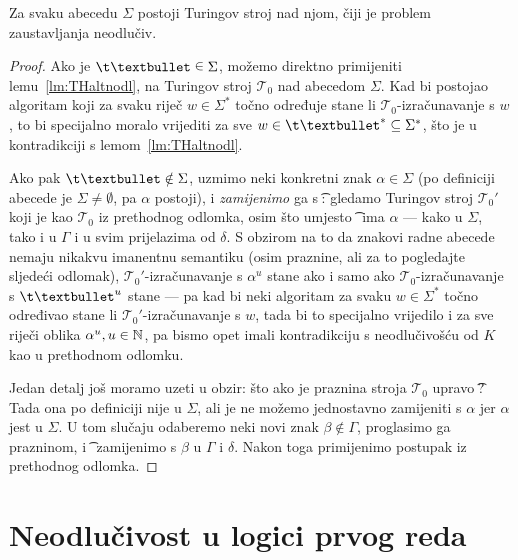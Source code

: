 \begin{propozicija}
Za svaku abecedu $\Sigma$ postoji Turingov stroj nad njom, čiji je problem zaustavljanja neodlučiv.
\end{propozicija}
\begin{proof}
Ako je $\t\textbullet\;\raisebox{1.1pt}{$\in$}\;\Sigma$, možemo direktno primijeniti lemu~\ref{lm:THaltnodl}, na Turingov stroj $\mathcal T_0$ nad abecedom $\Sigma$. Kad bi postojao algoritam koji za svaku riječ $w\in\Sigma^*$ točno određuje stane li $\mathcal T_0$-izračunavanje s $w$, to bi specijalno moralo vrijediti za sve $w\in\t\textbullet^*\subseteq\Sigma^*$, što je u kontradikciji s lemom~\ref{lm:THaltnodl}.

Ako pak $\t\textbullet\notin\Sigma$, uzmimo neki konkretni znak $\alpha\in\Sigma$ (po definiciji abecede je $\Sigma\ne\emptyset$, pa $\alpha$ postoji), i \emph{zamijenimo} ga s \t\textbullet: gledamo Turingov stroj $\mathcal T_0'$ koji je kao $\mathcal T_0$ iz prethodnog odlomka, osim što umjesto \t\textbullet\ ima $\alpha$ --- kako u $\Sigma$, tako i u $\Gamma$ i u svim prijelazima od $\delta$. S obzirom na to da znakovi radne abecede nemaju nikakvu imanentnu semantiku (osim praznine, ali za to pogledajte sljedeći odlomak), $\mathcal T_0'$-izračunavanje s $\alpha^u$ stane ako i samo ako $\mathcal T_0$-izračunavanje s $\t\textbullet^u$ stane --- pa kad bi neki algoritam za svaku $w\in\Sigma^*$ točno određivao stane li $\mathcal T_0'$-izračunavanje s $w$, tada bi to specijalno vrijedilo i za sve riječi oblika $\alpha^u,u\in{\mathbb N}$, pa bismo opet imali kontradikciju s neodlučivošću od $K$ kao u prethodnom odlomku.

Jedan detalj još moramo uzeti u obzir: što ako je praznina stroja $\mathcal T_0$ upravo \t\textbullet? Tada ona po definiciji nije u $\Sigma$, ali je ne možemo jednostavno zamijeniti s $\alpha$ jer $\alpha$ jest u $\Sigma$. U tom slučaju odaberemo neki novi znak $\beta\notin\Gamma$, proglasimo ga prazninom, i \t\textbullet\ zamijenimo s $\beta$ u $\Gamma$ i $\delta$. Nakon toga primijenimo postupak iz prethodnog odlomka.
\end{proof}

\section{Neodlučivost u logici prvog reda}


